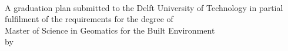 \thispagestyle{empty}

\begin{titlepage}
  \begin{addmargin}[-1cm]{-3cm}
    \begin{center}  
        \hfill
        \vfill

        \begingroup
            \LARGE \color{Cyan}\spacedallcaps{\myTitle}\\
        \endgroup
        \vspace{0.5cm}
        \begingroup
        \large\mySubTitle
        \endgroup
        
        \vspace{5cm}
        
        A graduation plan submitted to the Delft University of Technology in partial fulfilment of the requirements for the degree of\\
        \vspace{2cm}
        Master of Science in Geomatics for the Built Environment\\
        \vspace{4cm}
        by\\
        \bigskip
        \myName\\
        \bigskip
        \myGraduationMonth\xspace\myGraduationYear\\

        \vfill

    \end{center}  
  \end{addmargin}       
\end{titlepage}  
